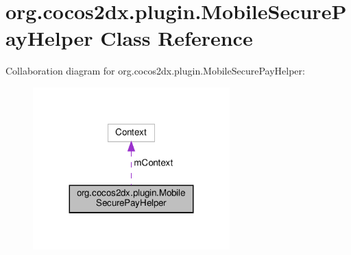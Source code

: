 \hypertarget{classorg_1_1cocos2dx_1_1plugin_1_1MobileSecurePayHelper}{}\section{org.\+cocos2dx.\+plugin.\+Mobile\+Secure\+Pay\+Helper Class Reference}
\label{classorg_1_1cocos2dx_1_1plugin_1_1MobileSecurePayHelper}


Collaboration diagram for org.\+cocos2dx.\+plugin.\+Mobile\+Secure\+Pay\+Helper\+:
\nopagebreak
\begin{figure}[H]
\begin{center}
\leavevmode
\includegraphics[width=215pt]{classorg_1_1cocos2dx_1_1plugin_1_1MobileSecurePayHelper__coll__graph}
\end{center}
\end{figure}
